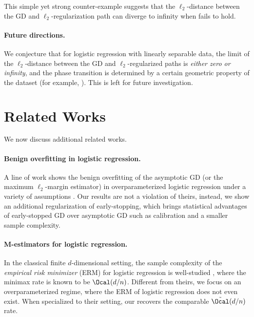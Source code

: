 \documentclass[11pt]{article}
\begin{document}
This simple yet strong counter-example suggests that the $\ell_2$-distance between the GD and $\ell_2$-regularization path can diverge to infinity when  fails to hold. 

\paragraph{Future directions.}
We conjecture that for logistic regression with linearly separable data,
the limit of the $\ell_2$-distance between the GD and $\ell_2$-regularized paths is \emph{either zero or infinity}, and the phase transition is determined by a certain geometric property of the dataset (for example, ). This is left for future investigation.


\section{Related Works}
We now discuss additional related works.


\paragraph{Benign overfitting in logistic regression.} 
A line of work shows the benign overfitting of the asymptotic GD (or the maximum $\ell_2$-margin estimator) in overparameterized logistic regression under a variety of assumptions \citep{montanari2019generalization,chatterji2021finite,cao2021risk,wang2022binary,muthukumar2021classification,shamir2023implicit}. 
Our results are not a violation of theirs, instead, we show an additional regularization of early-stopping, which brings statistical advantages of early-stopped GD over asymptotic GD such as calibration and a smaller sample complexity. 






\paragraph{M-estimators for logistic regression.}
In the classical finite $d$-dimensional setting, the sample complexity of the \emph{empirical risk minimizer} (ERM) for logistic regression is well-studied \citep{ostrovskii2021finite,kuchelmeister2024finite,hsu2024sample,chardon2024finite}, where the minimax rate is known to be $\Ocal(d/n)$.
Different from theirs, we focus on an overparameterized regime, where the ERM of logistic regression does not even exist. When specialized to their setting, our  recovers the comparable $\tilde{\Ocal}(d/n)$ rate.
\end{document}

